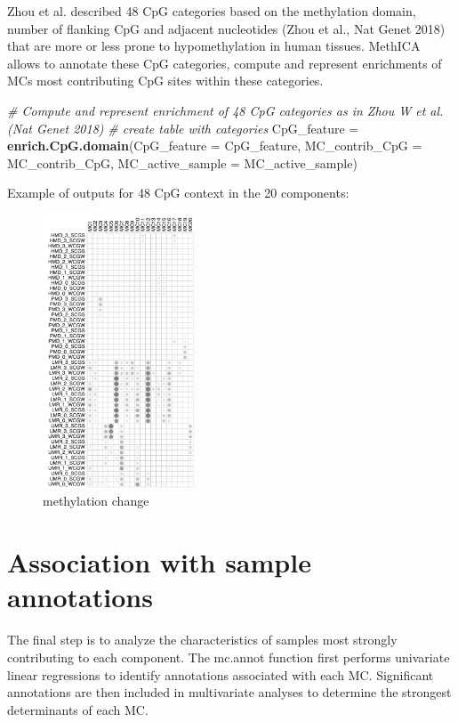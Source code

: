\documentclass[]{article}
\newenvironment{Shaded}{\begin{snugshade}}{\end{snugshade}}
\newcommand{\KeywordTok}[1]{\textcolor[rgb]{0.13,0.29,0.53}{\textbf{#1}}}
\newcommand{\DataTypeTok}[1]{\textcolor[rgb]{0.13,0.29,0.53}{#1}}
\newcommand{\StringTok}[1]{\textcolor[rgb]{0.31,0.60,0.02}{#1}}
\newcommand{\CommentTok}[1]{\textcolor[rgb]{0.56,0.35,0.01}{\textit{#1}}}
\newcommand{\NormalTok}[1]{#1}
\begin{document}
Zhou et al. described 48 CpG categories based on the methylation domain,
number of flanking CpG and adjacent nucleotides (Zhou et al., Nat Genet
2018) that are more or less prone to hypomethylation in human tissues.
MethICA allows to annotate these CpG categories, compute and represent
enrichments of MCs most contributing CpG sites within these categories.

\begin{Shaded}
\begin{Highlighting}[]
\CommentTok{# Compute and represent enrichment of 48 CpG categories as in Zhou W et al. (Nat Genet 2018)}
\CommentTok{# create table with categories}
\NormalTok{CpG_feature =}\StringTok{ }\KeywordTok{enrich.CpG.domain}\NormalTok{(}\DataTypeTok{CpG_feature =}\NormalTok{ CpG_feature, }\DataTypeTok{MC_contrib_CpG =}\NormalTok{ MC_contrib_CpG, }\DataTypeTok{MC_active_sample =}\NormalTok{ MC_active_sample)}
\end{Highlighting}
\end{Shaded}

Example of outputs for 48 CpG context in the 20 components:

\begin{figure}
\centering
\includegraphics[width=0.40000\textwidth,height=0.40000\textwidth]{./CpG_context_Zhou.png}
\caption{methylation change}
\end{figure}

\section{Association with sample
annotations}\label{association-with-sample-annotations}

The final step is to analyze the characteristics of samples most
strongly contributing to each component. The mc.annot function first
performs univariate linear regressions to identify annotations
associated with each MC. Significant annotations are then included in
multivariate analyses to determine the strongest determinants of each
MC.
\end{document}
